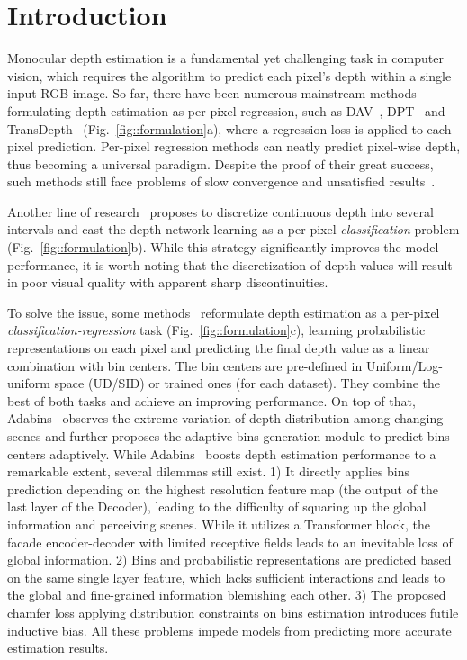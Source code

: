 \documentclass[runningheads]{llncs}
\begin{document}
 \section{Introduction}
Monocular depth estimation is a fundamental yet challenging task in computer vision, which requires the algorithm to predict each pixel's depth within a single input RGB image. So far, there have been numerous mainstream methods formulating depth estimation as per-pixel regression, such as DAV~\cite{huynh2020dav}, DPT~\cite{ranftl2021dpt} and TransDepth~\cite{yang2021transdepth} (Fig.~\ref{fig::formulation}a), where a regression loss is applied to each pixel prediction. Per-pixel regression methods can neatly predict pixel-wise depth, thus becoming a universal paradigm. Despite the proof of their great success, such methods still face problems of slow convergence and unsatisfied results~\cite{fu2018dorn}.


Another line of research~\cite{fu2018dorn,diaz2019soft} proposes to discretize continuous depth into several intervals and cast the depth network learning as a per-pixel \textit{classification} problem (Fig.~\ref{fig::formulation}b). While this strategy significantly improves the model performance, it is worth noting that the discretization of depth values will result in poor visual quality with apparent sharp discontinuities. 

To solve the issue, some methods~\cite{bhat2021adabins,johnston2020self} reformulate depth estimation as a per-pixel \textit{classification-regression} task (Fig.~\ref{fig::formulation}c), learning probabilistic representations on each pixel and predicting the final depth value as a linear combination with bin centers. The bin centers are pre-defined in Uniform/Log-uniform space (UD/SID) or trained ones (for each dataset). They combine the best of both tasks and achieve an improving performance. On top of that, Adabins~\cite{bhat2021adabins} observes the extreme variation of depth distribution among changing scenes and further proposes the adaptive bins generation module to predict bins centers adaptively. While Adabins~\cite{bhat2021adabins} boosts depth estimation performance to a remarkable extent, several dilemmas still exist. 1) It directly applies bins prediction depending on the highest resolution feature map (the output of the last layer of the Decoder), leading to the difficulty of squaring up the global information and perceiving scenes. While it utilizes a Transformer block, the facade encoder-decoder with limited receptive fields leads to an inevitable loss of global information. 2) Bins and probabilistic representations are predicted based on the same single layer feature, which lacks sufficient interactions and leads to the global and fine-grained information blemishing each other. 3) The proposed chamfer loss applying distribution constraints on bins estimation introduces futile inductive bias. All these problems impede models from predicting more accurate estimation results.
\end{document}
